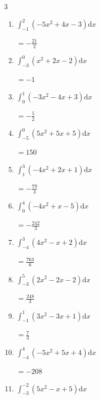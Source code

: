 \begin{multicols}{3}
\begin{enumerate}
        $\displaystyle =\frac{45}{2}$

  \item $\displaystyle \int_{-1}^{2}\left( -5x^{2}+4x-3 \right) \mathrm{d}x$

        $\displaystyle =-\frac{21}{2}$

  \item $\displaystyle \int_{-3}^{0}\left( x^{2}+2x-2 \right) \mathrm{d}x$

        $\displaystyle =-1$

\columnbreak %

  \item $\displaystyle \int_{0}^{1}\left( -3x^{2}-4x+3 \right) \mathrm{d}x$

        $\displaystyle =-\frac{5}{2}$

  \item $\displaystyle \int_{-5}^{0}\left( 5x^{2}+5x+5 \right) \mathrm{d}x$

        $\displaystyle =150$

  \item $\displaystyle \int_{1}^{3}\left( -4x^{2}+2x+1 \right) \mathrm{d}x$

        $\displaystyle =-\frac{79}{3}$

  \item $\displaystyle \int_{0}^{4}\left( -4x^{2}+x-5 \right) \mathrm{d}x$

        $\displaystyle =-\frac{242}{3}$

  \item $\displaystyle \int_{-4}^{3}\left( 4x^{2}-x+2 \right) \mathrm{d}x$

        $\displaystyle =\frac{763}{6}$

\columnbreak %

  \item $\displaystyle \int_{-3}^{5}\left( 2x^{2}-2x-2 \right) \mathrm{d}x$

        $\displaystyle =\frac{248}{3}$

  \item $\displaystyle \int_{-1}^{1}\left( 3x^{2}-3x+1 \right) \mathrm{d}x$

        $\displaystyle =\frac{7}{3}$

  \item $\displaystyle \int_{-4}^{4}\left( -5x^{2}+5x+4 \right) \mathrm{d}x$

        $\displaystyle =-208$

  \item $\displaystyle \int_{-3}^{-2}\left( 5x^{2}-x+5 \right) \mathrm{d}x$


\end{enumerate}
\end{multicols}
